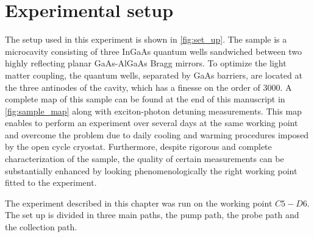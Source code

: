\section{Experimental setup}
The setup used in this experiment is shown in \autoref{fig:set_up}. The sample is a microcavity consisting of three InGaAs quantum wells sandwiched between two highly reflecting planar GaAs-AlGaAs Bragg mirrors.
To optimize the light matter coupling, the quantum wells, separated by GaAs barriers, are located at the three antinodes of the cavity, which has a finesse on the order of 3000. A complete map of this sample 
 can be found at the end of this manuscript in \autoref{fig:sample_map} along with exciton-photon detuning measurements. This map enables to perform an experiment over several days at the same working point and overcome the problem due to daily cooling and warming procedures imposed by the open cycle cryostat. Furthermore, despite rigorous and complete
 characterization of the sample, the quality of certain measurements can be substantially enhanced by looking phenomenologically the right working point fitted to the experiment. 
 
 The experiment described in this chapter was run on the working point $C5-D6$.
 The set up is divided in three main paths, the pump path, the probe path and the collection path.


